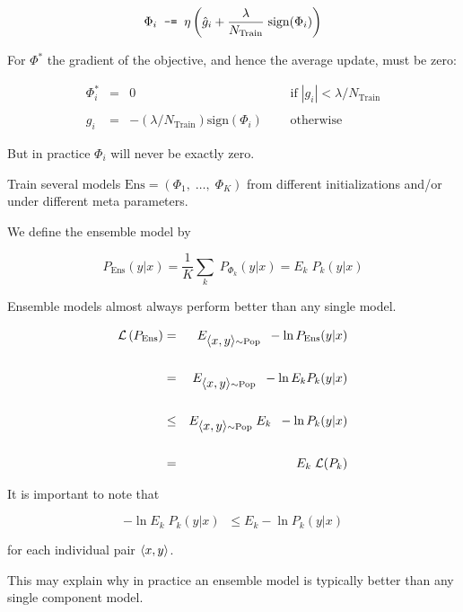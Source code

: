 {

$$\Phi_i \;\;  \mbox{\tt -=} \;\;  \eta \left(\hat{g}_i + \frac{\lambda}{N_{\mathrm{Train}}}\;\mathrm{sign}(\Phi_i)\right)$$
\vfill

\vfill
For $\Phi^*$ the gradient of the objective, and hence the average update, must be zero:

\vfill
$$\begin{array}{rcll}
\Phi^*_i &  = & 0  & \;\;\;\;\;\mbox{if} \;|g_i| <  \lambda/N_{\mathrm{Train}} \\
\\
g_i & = &  -(\lambda/N_{\mathrm{Train}}) \mathrm{sign}(\Phi_i) &\;\;\;\;\; \mbox{otherwise}
\end{array}$$

\vfill
But in practice $\Phi_i$ will never be exactly zero.


Train several models $\mathrm{Ens} = (\Phi_1,\;\ldots,\; \Phi_K)$ from different initializations and/or under different meta parameters.

\vfill
We define the ensemble model by

$$P_\mathrm{Ens}(y|x) = \frac{1}{K} \sum_k\; P_{\Phi_k}(y|x) = E_k \;P_k(y|x)$$

\vfill
Ensemble models almost always perform better than any single model.


\vfill
{}

\begin{eqnarray*}
{\cal L}\left(P_\mathrm{Ens}\right) & = & E_{{\mbox{$\langle x,y\rangle$}} \sim \mathrm{Pop}}\;\;-\ln P_\mathrm{Ens}(y|x) \\
\\
 & = & E_{{\mbox{$\langle x,y\rangle$}} \sim \mathrm{Pop}}\;\;-\ln E_k P_k(y|x) \\
\\
& \leq & E_{{\mbox{$\langle x,y\rangle$}} \sim \mathrm{Pop}} \;E_k\;\;-\ln P_k(y|x) \\
\\
& = & E_k\; {\cal L}(P_k)
\end{eqnarray*}


It is important to note that

\vfill
$$-\ln E_k \;P_k(y|x) \;\;\leq E_k -\ln P_k(y|x)$$

\vfill
for each individual pair ${\mbox{$\langle x,y\rangle$}}$.

\vfill
This may explain why in practice an ensemble model is typically better than any single component model.


}

